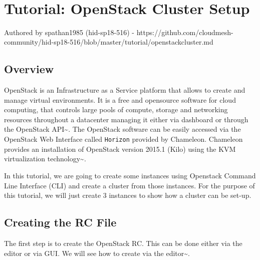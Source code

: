 \MDNAME\

\section{Tutorial: OpenStack Cluster Setup}

Authored by spathan1985 (hid-sp18-516) -
https://github.com/cloudmesh-community/hid-sp18-516/blob/master/tutorial/openstackcluster.md

\subsection{Overview}

OpenStack is an Infrastructure as a Service platform that allows to
create and manage virtual environments. It is a free and opensource
software for cloud computing, that controls large pools of compute,
storage and networking resources throughout a datacenter managing it
either via dashboard or through the OpenStack
API\textasciitilde{}\cite{hid-sp18-516-www-openstack}. The OpenStack
software can be easily accessed via the OpenStack Web Interface called
\texttt{Horizon} provided by Chameleon. Chameleon provides an
installation of OpenStack version 2015.1 (Kilo) using the KVM
virtualization
technology\textasciitilde{}\cite{hid-sp18-516-www-chameleon}.

In this tutorial, we are going to create some instances using Openstack
Command Line Interface (CLI) and create a cluster from those instances.
For the purpose of this tutorial, we will just create 3 instances to
show how a cluster can be set-up.

\subsection{Creating the RC File}

The first step is to create the OpenStack RC. This can be done either
via the editor or via GUI. We will see how to create via the
editor\textasciitilde{}\cite{hid-sp18-516-las17handbook}.

